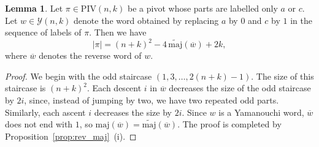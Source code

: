 \documentclass[11pt]{article}
\theoremstyle{definition}
\newtheorem{lemma}[theorem]{Lemma}
\theoremstyle{remark}
\theoremstyle{definition}
\numberwithin{equation}{section}
\begin{document}
\begin{lemma}\label{lem:wt_pivot_2}
Let \( \pi \in \mathrm{PIV}(n,k)\) be a pivot whose parts are labelled only $a$ or $c$. Let $w\in\mathcal{Y}(n,k)$ denote the word obtained by replacing $a$ by $0$ and $c$ by $1$ in the sequence of labels of $\pi$. Then we have
  \[
    |\pi| = (n+k)^2-4\,\widetilde{\mathrm{maj}}(\overline{w})+2k,
  \]
where $\overline{w}$ denotes the reverse word of $w$.
\end{lemma}
\begin{proof}
We begin with the odd staircase $(1,3,\ldots,2(n+k)-1)$. The size of this staircase is $(n+k)^2$. Each descent \( i \) in $\overline{w}$ decreases the size of the odd staircase by \( 2i \), since, instead of jumping by two, we have two repeated odd parts. Similarly, each ascent \( i \) decreases the size by \( 2i \). Since $w$ is a Yamanouchi word, $\overline{w}$ does not end with $1$, so $\mathrm{maj}(\overline{w})=\widetilde{\mathrm{maj}}(\overline{w})$. The proof is completed by Proposition~\ref{prop:rev_maj}~(i).
\end{proof}
\end{document}
